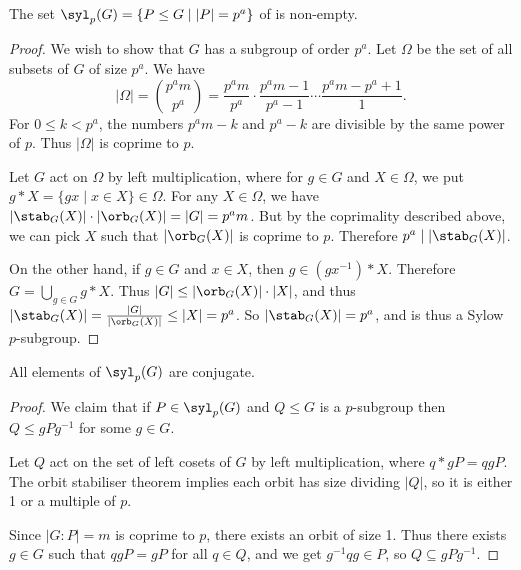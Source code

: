 \begin{theorem}
	The set $\syl_p(G) = \{P \leq G \mid |P| = p^a \}$ of  is non-empty.
\end{theorem}
\begin{proof}
	We wish to show that $G$ has a subgroup of order $p^a$.
	Let $\Omega$ be the set of all subsets of $G$ of size $p^a$.
	We have
	$$
	|\Omega| = \binom{p^a m}{p^a} = \frac{p^a m}{p^a} \cdot \frac{p^a m - 1}{p^a - 1} \cdots \frac{p^a m - p^a + 1}{1}.
	$$
	For $0 \leq k < p^a$, the numbers $p^am - k$ and $p^a  -k$ are divisible by the same power of $p$. Thus $|\Omega|$ is coprime to $p$.

	Let $G$ act on $\Omega$ by left multiplication, where for $g \in G$ and $X \in \Omega$, we put $g*X = \{gx \mid x \in X\} \in \Omega$. For any $X \in \Omega$, we have $|\stab_G(X)| \cdot |\orb_G(X)| = |G| = p^a m$. But by the coprimality described above, we can pick $X$ such that $|\orb_G(X)|$ is coprime to $p$. Therefore $p^a \mid |\stab_G(X)|$.

On the other hand, if $g \in G$ and $x \in X$, then $g \in (g x^{-1}) * X$. Therefore $G = \bigcup_{g \in G} g*X$. Thus $|G| \leq |\orb_G(X)| \cdot |X|$, and thus $|\stab_G(X)| = \frac{|G|}{|\orb_G(X)|} \leq |X| = p^a$. So $|\stab_G(X)| = p^a$, and is thus a Sylow $p$-subgroup.
\end{proof}

\begin{theorem}
	All elements of $\syl_p(G)$ are conjugate.
\end{theorem}
\begin{proof}
	We claim that if $P \in \syl_p(G)$ and $Q \leq G$ is a $p$-subgroup then $Q \leq gPg^{-1}$ for some $g \in G$.
	
	Let $Q$ act on the set of left cosets of $G$ by left multiplication, where $q * gP = qgP$. The orbit stabiliser theorem implies each orbit has size dividing $|Q|$, so it is either 1 or a multiple of $p$. 

	Since $|G:P| = m$ is coprime to $p$, there exists an orbit of size 1. Thus there exists $g \in G$ such that $qgP = gP$ for all $q \in Q$, and we get $g^{-1}q g \in P$, so $Q \subseteq gPg^{-1}$.
\end{proof}

